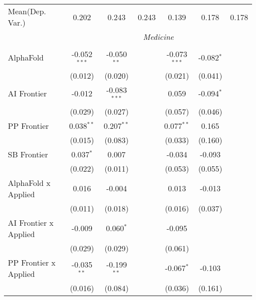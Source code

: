 \begin{tabular}{lcccccc}
Mean(Dep. Var.) & 0.202 & 0.243 & 0.243 & 0.139 & 0.178 & 0.178 \\
 & \multicolumn{6}{c}{\textit{Medicine}} \\ \\
   AlphaFold                                   & -0.052$^{***}$ & -0.050$^{**}$  &                & -0.073$^{***}$ & -0.082$^{*}$ &   \\   
                                               & (0.012)        & (0.020)        &                & (0.021)        & (0.041)      &   \\   
   AI Frontier                                 & -0.012         & -0.083$^{***}$ &                & 0.059          & -0.094$^{*}$ &   \\   
                                               & (0.029)        & (0.027)        &                & (0.057)        & (0.046)      &   \\   
   PP Frontier                                 & 0.038$^{**}$   & 0.207$^{**}$   &                & 0.077$^{**}$   & 0.165        &   \\   
                                               & (0.015)        & (0.083)        &                & (0.033)        & (0.160)      &   \\   
   SB Frontier                                 & 0.037$^{*}$    & 0.007          &                & -0.034         & -0.093       &   \\   
                                               & (0.022)        & (0.011)        &                & (0.053)        & (0.055)      &   \\   
   AlphaFold x Applied                         & 0.016          & -0.004         &                & 0.013          & -0.013       &   \\   
                                               & (0.011)        & (0.018)        &                & (0.016)        & (0.037)      &   \\   
   AI Frontier x Applied                       & -0.009         & 0.060$^{*}$    &                & -0.095         &              &   \\   
                                               & (0.029)        & (0.029)        &                & (0.061)        &              &   \\   
   PP Frontier x Applied                       & -0.035$^{**}$  & -0.199$^{**}$  &                & -0.067$^{*}$   & -0.103       &   \\   
                                               & (0.016)        & (0.084)        &                & (0.036)        & (0.161)      &   \\   

\end{tabular}
